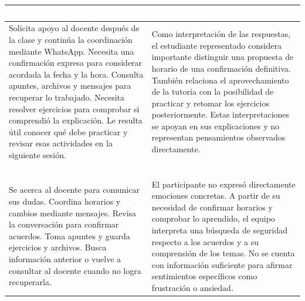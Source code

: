 \documentclass[11pt,a4paper]{article}
\begin{document}
\begin{tabularx}{\textwidth}{
    |>{\columncolor{azulclaro}\raggedright\arraybackslash}X
    |>{\raggedright\arraybackslash}X|
}
\hline
\rowcolor{azul}
\textcolor{white}{\textbf{¿Qué dice?}} &
\textcolor{white}{\textbf{¿Qué piensa?}} \\
\hline
Solicita apoyo al docente después de la clase y continúa la coordinación mediante WhatsApp. \newline
Necesita una confirmación expresa para considerar acordada la fecha y la hora. \newline
Consulta apuntes, archivos y mensajes para recuperar lo trabajado. \newline
Necesita resolver ejercicios para comprobar si comprendió la explicación. \newline
Le resulta útil conocer qué debe practicar y revisar esas actividades en la siguiente sesión. &
Como interpretación de las respuestas, el estudiante representado considera importante distinguir una propuesta de horario de una confirmación definitiva. \newline
También relaciona el aprovechamiento de la tutoría con la posibilidad de practicar y retomar los ejercicios posteriormente. \newline
Estas interpretaciones se apoyan en sus explicaciones y no representan pensamientos observados directamente. \\
\hline
\rowcolor{azul}
\textcolor{white}{\textbf{¿Qué hace?}} &
\textcolor{white}{\textbf{¿Qué siente?}} \\
\hline
Se acerca al docente para comunicar sus dudas. \newline
Coordina horarios y cambios mediante mensajes. \newline
Revisa la conversación para confirmar acuerdos. \newline
Toma apuntes y guarda ejercicios y archivos. \newline
Busca información anterior o vuelve a consultar al docente cuando no logra recuperarla. &
El participante no expresó directamente emociones concretas. \newline
A partir de su necesidad de confirmar horarios y comprobar lo aprendido, el equipo interpreta una búsqueda de seguridad respecto a los acuerdos y a su comprensión de los temas. \newline
No se cuenta con información suficiente para afirmar sentimientos específicos como frustración o ansiedad. \\
\hline
\end{tabularx}
\end{document}

